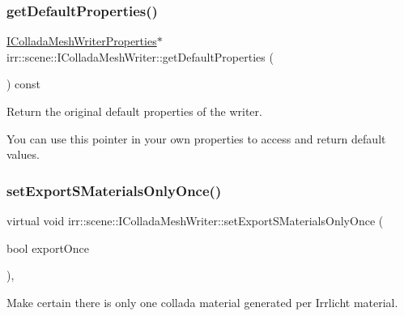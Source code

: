 \subsubsection{\texorpdfstring{get\+Default\+Properties()}{getDefaultProperties()}\hspace{0.1cm}{\footnotesize\ttfamily [2/2]}}
{\footnotesize\ttfamily \hyperlink{classirr_1_1scene_1_1IColladaMeshWriterProperties}{I\+Collada\+Mesh\+Writer\+Properties}$\ast$ irr\+::scene\+::\+I\+Collada\+Mesh\+Writer\+::get\+Default\+Properties (\begin{DoxyParamCaption}{ }\end{DoxyParamCaption}) const\hspace{0.3cm}{\ttfamily [inline]}}



Return the original default properties of the writer. 

You can use this pointer in your own properties to access and return default values. \mbox{\label{classirr_1_1scene_1_1IColladaMeshWriter_af6f37ca4a1ef6238cc079f3f5d5eb612}} 
\subsubsection{\texorpdfstring{set\+Export\+S\+Materials\+Only\+Once()}{setExportSMaterialsOnlyOnce()}\hspace{0.1cm}{\footnotesize\ttfamily [1/2]}}
{\footnotesize\ttfamily virtual void irr\+::scene\+::\+I\+Collada\+Mesh\+Writer\+::set\+Export\+S\+Materials\+Only\+Once (\begin{DoxyParamCaption}\item[{bool}]{export\+Once }\end{DoxyParamCaption})\hspace{0.3cm}{\ttfamily [inline]}, {\ttfamily [virtual]}}



Make certain there is only one collada material generated per Irrlicht material. 

